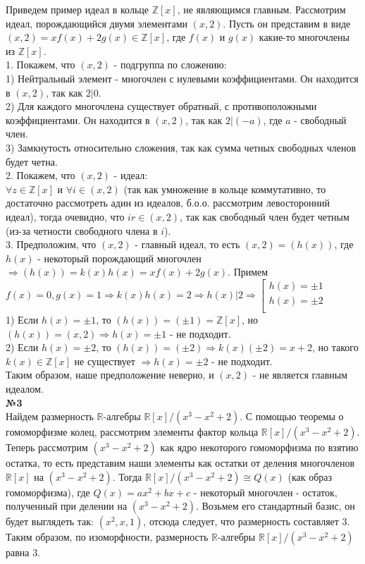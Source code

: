 \documentclass[a4paper, 12pt]{article}
\newcommand\tab[1][1cm]{\hspace*{#1}}
\begin{document}
	Приведем пример идеал в кольце $\mathbb Z[x]$, не являющимся главным. Рассмотрим идеал, порождающийся двумя элементами $(x, 2)$. Пусть он представим в виде $(x, 2) = xf(x) + 2g(x) \in \mathbb Z[x]$, где $f(x)$ и $g(x)$ какие-то многочлены из $\mathbb Z[x]$. \\
	1. Покажем, что $(x, 2)$ - подгруппа по сложению:\\
	\tab 1) Нейтральный элемент - многочлен с нулевыми коэффициентами. Он находится в $(x,2)$, так как $2|0$. \\
	\tab 2) Для каждого многочлена существует обратный, с противоположными коэффициентами. Он находится в $(x,2)$, так как $2|(-a)$, где $a$ - свободный член. \\
	\tab 3) Замкнутость относительно сложения, так как сумма четных свободных членов будет четна. \\
	2. Покажем, что $(x, 2)$ - идеал: \\
	$\forall z \in \mathbb Z[x]$ и $\forall i \in (x, 2)$ (так как умножение в кольце коммутативно, то достаточно рассмотреть адин из идеалов, б.о.о. рассмотрим левосторонний идеал), тогда очевидно, что $ir \in (x,2)$, так как свободный член будет четным (из-за четности свободного члена в $i$). \\
	3. Предположим, что $(x,2)$ - главный идеал, то есть $(x,2) = (h(x))$, где $h(x)$ - некоторый порождающий многочлен $\Rightarrow (h(x)) = k(x)h(x) = xf(x) + 2g(x)$. Примем $f(x) = 0, g(x) = 1 \Rightarrow k(x)h(x) = 2 \Rightarrow h(x)|2 \Rightarrow 
	\left[ 
		\begin{gathered} 
			h(x) = \pm 1 \\ 
			h(x) = \pm 2 \\ 
		\end{gathered} 
	\right.$ \\
	\tab 1)  Если $h(x) = \pm 1$, то $(h(x)) = (\pm1) = \mathbb Z[x]$, но $(h(x)) = (x, 2) \Rightarrow h(x) = \pm 1$ - не подходит. \\
	\tab 2)  Если $h(x) = \pm 2$, то $(h(x)) = (\pm2) \Rightarrow k(x)(\pm2) = x + 2$, но такого $k(x) \in \mathbb Z[x]$ не существует $\Rightarrow h(x) = \pm 2$ - не подходит. \\
	Таким образом, наше предположение неверно, и $(x, 2)$ -  не является главным идеалом. \\
	
	\textbf{№3} \\
	
	Найдем размерность $\mathbb R$-алгебры $\mathbb R[x]/(x^3 - x^2 + 2)$. С помощью теоремы о гомоморфизме колец, рассмотрим элементы фактор кольца $\mathbb R[x]/(x^3 - x^2 + 2)$. Теперь рассмотрим $(x^3 - x^2 + 2)$ как ядро некоторого гомоморфизма по взятию остатка, то есть представим наши элементы как остатки от деления многочленов $\mathbb R[x]$ на $(x^3 - x^2 + 2)$. Тогда $\mathbb R[x]/(x^3 - x^2 + 2) \cong Q(x)$ (как образ гомоморфизма), где $Q(x) = ax^2 + bx + c$ - некоторый многочлен - остаток, полученный при делении на $(x^3 - x^2 + 2)$. Возьмем его стандартный базис, он будет выглядеть так: $(x^2, x, 1)$, отсюда следует, что размерность составляет 3. Таким образом, по изоморфности, размерность $\mathbb R$-алгебры $\mathbb R[x]/(x^3 - x^2 + 2)$ равна 3. \\
	
\end{document}
